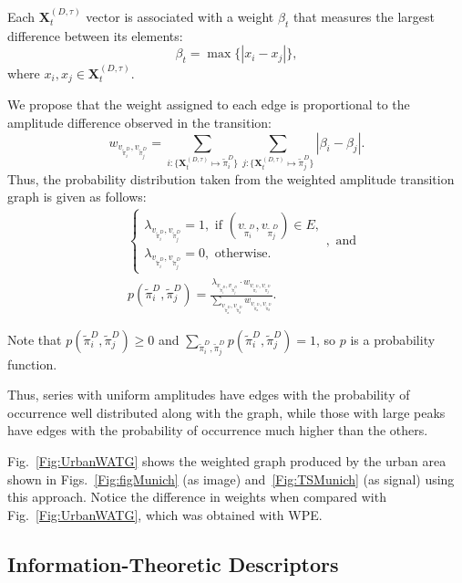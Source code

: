 \documentclass[journal]{IEEEtran}
\begin{document}
Each $\mathbf{X}^{(D, \tau)}_t$ vector is associated with a weight $\beta_t$ that measures the largest difference between its elements:
\begin{equation}
\beta_t = \max\{|x_i - x_j|\},
\end{equation}
where $x_i, x_j \in \mathbf{X}^{(D, \tau)}_t$.

We propose that the weight assigned to each edge is proportional to the amplitude difference observed in the transition:	
\begin{equation}
w_{v_{\widetilde \pi^D_i}, v_{\widetilde \pi^D_j}} =  \sum_{i : \{\mathbf{X}^{(D,\tau)}_t \mapsto \widetilde\pi^D_i\}} \sum_{j : \{\mathbf{X}^{(D,\tau)}_t \mapsto \widetilde\pi^D_j\}} |\beta_i - \beta_j| .
\end{equation}
Thus, the probability distribution taken from the weighted amplitude transition graph is given as follows:	
\begin{align}
&\left\{\begin{array}{l}
\lambda_{v_{\widetilde\pi^D_i}, v_{\widetilde\pi^D_j}} = 1, \text{ if } (v_{\widetilde\pi^D_i}, v_{\widetilde\pi^D_j}) \in {E}, \\
\lambda_{v_{\widetilde\pi^D_i}, v_{\widetilde\pi^D_j}} = 0, \text{ otherwise}.
\end{array}\right., \text{ and} \\
&p(\widetilde\pi^D_i, \widetilde\pi^D_j) = \frac{\lambda_{v_{\widetilde\pi^D_i}, v_{\widetilde\pi^D_j}} \cdot w_{v_{\widetilde\pi^D_i}, v_{\widetilde\pi^D_j}}}{\sum_{v_{\widetilde\pi^D_a}, v_{\widetilde\pi^D_b}} w_{v_{\widetilde\pi^D_a}, v_{\widetilde\pi^D_b}}}.
\end{align}

Note that  $p(\widetilde\pi^D_i, \widetilde\pi^D_j) \ge 0$ and $\sum_{\widetilde\pi^D_i, \widetilde\pi^D_j} p(\widetilde\pi^D_i, \widetilde\pi^D_j) = 1$, so $p$ is a probability function.

Thus, series with uniform amplitudes have edges with the probability of occurrence well distributed along with the graph, while those with large peaks have edges with the probability of occurrence much higher than the others.

Fig.~\ref{Fig:UrbanWATG} shows the weighted graph produced by the urban  area shown in Figs.~\ref{Fig:figMunich} (as image) and~\ref{Fig:TSMunich} (as signal) using this approach.
Notice the difference in weights when compared with Fig.~\ref{Fig:UrbanWATG}, which was obtained with WPE.


\subsection{Information-Theoretic Descriptors}\label{HC}
\end{document}
